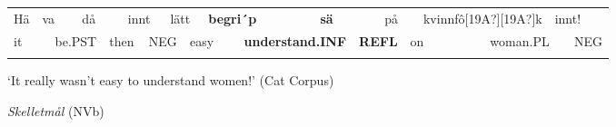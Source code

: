 \begin{tabular}{llllllllllllllllllll}
\lsptoprule
Hä & \multicolumn{2}{l}{va

} & \multicolumn{2}{l}{då

} & \multicolumn{2}{l}{innt

} & \multicolumn{2}{l}{lätt

} & \multicolumn{2}{l}{{\bfseries begri´p}

} & \multicolumn{2}{l}{{\bfseries sä}

} & \multicolumn{2}{l}{på

} & \multicolumn{2}{l}{kvinnfô[19A?][19A?]k

} & \multicolumn{2}{l}{innt!

} & \\
\multicolumn{2}{l}{it

} & \multicolumn{2}{l}{be.PST

} & \multicolumn{2}{l}{then

} & \multicolumn{2}{l}{NEG

} & \multicolumn{2}{l}{easy

} & \multicolumn{2}{l}{{\bfseries understand.INF}

} & \multicolumn{2}{l}{{\bfseries REFL}

} & \multicolumn{2}{l}{on

} & \multicolumn{2}{l}{woman.PL

} & \multicolumn{2}{l}{NEG

}\\
\lspbottomrule
\end{tabular}

\begin{styleTranslation}
‘It really wasn’t easy to understand women!’ (Cat Corpus)

\end{styleTranslation}

\begin{listWWNumileveli}
\item {}

\begin{styleExample}
\textit{Skelletmål} (NVb)

\end{styleExample}

\end{listWWNumileveli}

